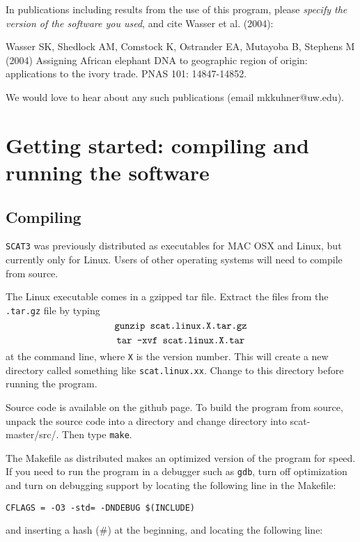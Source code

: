 \documentclass[10pt,titlepage,times,letterpaper]{article}
\def\SCAT{{\tt SCAT3} }
\begin{document}
In publications including results from the use of this program, please
{\it specify the version of the software you used}, and cite Wasser
et al. (2004):

Wasser SK, Shedlock AM, Comstock K, Ostrander EA, Mutayoba B, Stephens M (2004)
Assigning African elephant DNA to geographic region of origin:  applications
to the ivory trade.  PNAS 101: 14847-14852.

We would love to hear about any such publications
(email mkkuhner@uw.edu).


\section{Getting started: compiling and running the software} \label{started}

\subsection{Compiling}

\SCAT was previously distributed as executables for MAC OSX and
Linux, but currently only for Linux.  Users of other operating systems
will need to compile from source.

The Linux executable comes in a gzipped tar file.
Extract the files from the {\tt .tar.gz} file by typing
$$\text{{\tt gunzip scat.linux.X.tar.gz}}$$
$$\text{{\tt tar -xvf scat.linux.X.tar}}$$
at the command line, where {\tt X} is the version number.
This will create a new directory called something like
{\tt scat.linux.xx}. Change to this directory before
running the program.

Source code is available on the github page. 
To build the program from source, unpack the source code into a directory 
and change directory into scat-master/src/.  Then type {\tt make}.

The Makefile as distributed makes an optimized version of the program for speed.
If you need to run the program in a debugger such as {\tt gdb}, turn off optimization 
and turn on debugging support by locating the following line in the Makefile:

\begin{verbatim}
CFLAGS = -O3 -std= -DNDEBUG $(INCLUDE)
\end{verbatim}

and inserting a hash (\#) at the beginning, and locating the following line:
\end{document}
